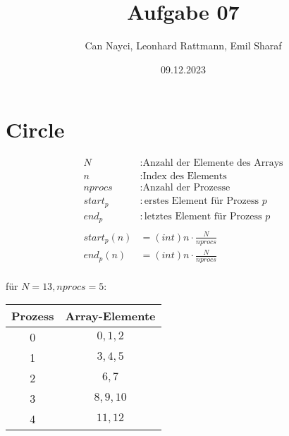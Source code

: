 \documentclass[a4paper,10pt]{article}
\title{Aufgabe 07}
\author{Can Nayci, Leonhard Rattmann, Emil Sharaf}
\date{09.12.2023}
\begin{document}
\maketitle

\section{Circle}
\begin{align*}
 N &: \text{Anzahl der Elemente des Arrays} \\
 n &: \text{Index des Elements} \\
 nprocs &: \text{Anzahl der Prozesse} \\
 start_p &: \text{erstes Element für Prozess } p\\
 end_p &: \text{letztes Element für Prozess } p\\
 \\
 start_p(n) &= (int) n \cdot \frac{N}{nprocs}\\
 end_p(n) &= (int) n \cdot \frac{N}{nprocs}
\end{align*}\\
für $N = 13, nprocs = 5$:
\begin{tabular}{c | c}
 Prozess & Array-Elemente \\
 \hline
 0 & $0,1,2$\\
 1 & $3,4,5$\\
 2 & $6,7$\\
 3 & $8,9,10$\\
 4 & $11,12$\\
\end{tabular}
\end{document}

